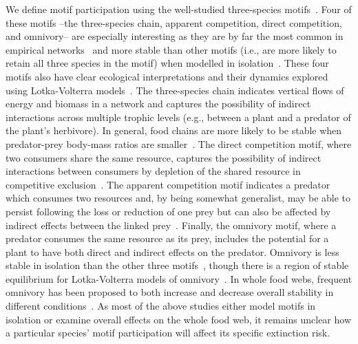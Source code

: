 \documentclass[12pt]{article}
\begin{document}
\begin{spacing}{1.0}
    We define motif participation using the well-studied three-species motifs~\citep{Milo2004,Stouffer2007,Stouffer2012}. 
    Four of these motifs --the three-species chain, apparent competition, direct competition, and omnivory-- are especially interesting as they are by far the most common in empirical networks~\citep{Stouffer2007, giling2019plant} and more stable than other motifs (i.e., are more likely to retain all three species in the motif) when modelled in isolation~\citep{Borrelli2015a}.
    These four motifs also have clear ecological interpretations and their dynamics explored using Lotka-Volterra models~\citep{Hsu2015}.
    The three-species chain indicates vertical flows of energy and biomass in a network and captures the possibility of indirect interactions across multiple trophic levels (e.g., between a plant and a predator of the plant's herbivore).
    In general, food chains are more likely to be stable when predator-prey body-mass ratios are smaller~\citep{Jonsson1998}.
    The direct competition motif, where two consumers share the same resource, captures the possibility of indirect interactions between consumers by depletion of the shared resource in competitive exclusion~\citep{Hsu2015}. 
    The apparent competition motif indicates a predator which consumes two resources and, by being somewhat generalist, may be able to persist following the loss or reduction of one prey but can also be affected by indirect effects between the linked prey~\citep{Melian2002}.
    Finally, the omnivory motif, where a predator consumes the same resource as its prey, includes  the potential for a plant to have both direct and indirect effects on the predator. 
    Omnivory is less stable in isolation than the other three motifs~\citep{Borrelli2015a}, though there is a region of stable equilibrium for Lotka-Volterra models of omnivory~\citep{Hsu2015}.
    In whole food webs, frequent omnivory has been proposed to both increase and decrease overall stability in different conditions~\citep{McCann1997,Emmerson2004,Monteiro2016}.
    As most of the above studies either model motifs in isolation or examine overall effects on the whole food web, it remains unclear how a particular species' motif participation will affect its specific extinction risk.


\end{spacing}
\end{document}
